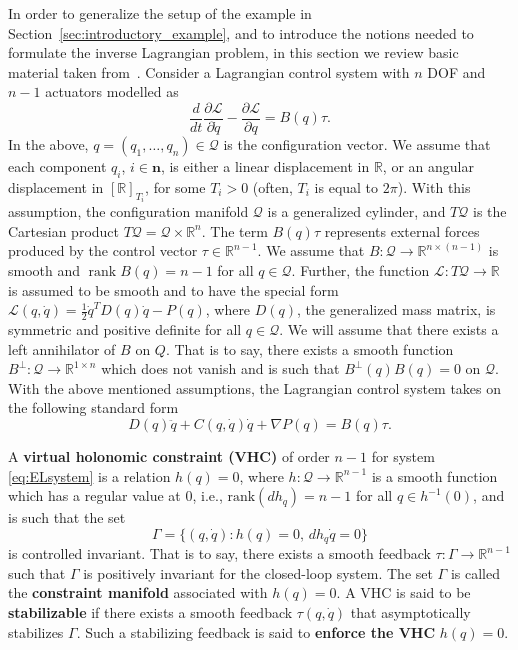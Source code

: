 In order to generalize the setup of the example in
Section~\ref{sec:introductory_example}, and to introduce the notions
needed to formulate the inverse Lagrangian problem, in this section we
review  basic material taken from~\cite{Maggiore-2012}. Consider a
Lagrangian control system with $n$ DOF and $n-1$ actuators modelled as
\[
{\frac{d}{dt}\frac{\partial{{\mathcal{L}}}}{\partial\dot{{q}}}-
	\frac{\partial{{\mathcal{L}}}}{\partial {q}}}=B(q)\tau.
\]
In the above, $q = (q_1, \ldots,q_n) \in \mathcal{Q}$ is the configuration
vector. We assume that each component $q_i$, $i \in {{\mathbf n}}$, is either a
linear displacement in $\mathbb{R}$, or an angular displacement in
$[\mathbb{R}]_{T_i}$, for some $T_i >0$ (often, $T_i$ is equal to $2 \pi$).
With this assumption, the configuration manifold $\mathcal{Q}$ is a
generalized cylinder, and $T\mathcal{Q}$ is the Cartesian product $T\mathcal{Q} = \mathcal{Q}
\times \mathbb{R}^n$. The term $B(q) \tau$ represents external forces
produced by the control vector $\tau \in \mathbb{R}^{n-1}$. We assume that
$B:\mathcal{Q} \to \mathbb{R}^{n\times (n-1)}$ is smooth and $\operatorname{rank} B(q)=n-1$ for all
$q \in \mathcal{Q}$. Further, the function $\mathcal{L}: T \mathcal{Q} \to \mathbb{R}$ is assumed to
be smooth and to have the special form
$\mathcal{L}(q,\dot{q})=\frac{1}{2}\dot{q}^TD(q)\dot{q}-P(q)$, where $D(q)$,
the generalized mass matrix, is symmetric and positive definite for
all $q\in\mathcal{Q}$. We will assume that there exists a left annihilator of
$B$ on $Q$. That is to say, there exists a smooth function
$B^\perp:\mathcal{Q}\to\mathbb{R}^{1\times n}$ which does not vanish and is such that
$B^\perp(q)B(q)=0$ on $\mathcal{Q}$. With the above mentioned assumptions, the
Lagrangian control system takes on the following standard form
\begin{equation}
\label{eq:ELsystem}
D(q)\ddot{q}+C(q,\dot{q})\dot{q}+\nabla P(q)= B(q)\tau.
\end{equation}
\begin{definition}
	\label{def:VHC}
	A {\bf virtual holonomic constraint (VHC)} of order $n-1$ for system
	\eqref{eq:ELsystem} is a relation $h(q)=0$, where
	$h:\mathcal{Q}\to\mathbb{R}^{n-1}$ is a smooth function which has a regular value at
	$0$, i.e., $\mbox{rank}(dh_q)=n-1$ for all $q\in
	h^{-1}(0)$, and is such that the set
				\begin{equation}
	\label{eq:ConstManifold}
	\Gamma = \{(q,\dot{q}): h(q)=0,\,dh_q\dot{q}=0\}
	\end{equation}
				\noindent is controlled invariant. That is to say, there exists a
	smooth feedback $\tau: \Gamma \to \mathbb{R}^{n-1}$ such that $\Gamma$ is
	positively invariant for the closed-loop system. The set $\Gamma$ is
	called the {\bf constraint manifold} associated with $h(q)=0$. A
	VHC is said to be {\bf stabilizable} if there exists a smooth feedback
	$\tau(q,\dot{q})$ that asymptotically stabilizes $\Gamma$. Such a
	stabilizing feedback is said to {\bf enforce the VHC} $h(q)=0$.
\end{definition}

